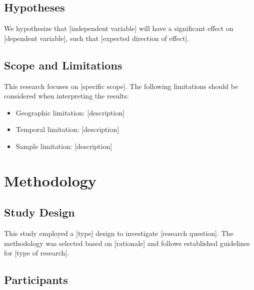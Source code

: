 \documentclass[11pt,letterpaper]{report}
\begin{document}
\section{Hypotheses}

\begin{hypothesis}
We hypothesize that [independent variable] will have a significant effect on [dependent variable], such that [expected direction of effect].
\end{hypothesis}

\section{Scope and Limitations}

\begin{limitations}
This research focuses on [specific scope]. The following limitations should be considered when interpreting the results:
\begin{itemize}
    \item Geographic limitation: [description]
    \item Temporal limitation: [description]
    \item Sample limitation: [description]
\end{itemize}
\end{limitations}


\chapter{Methodology}

\section{Study Design}

\begin{methodology}
This study employed a [type] design to investigate [research question]. The methodology was selected based on [rationale] and follows established guidelines for [type of research].
\end{methodology}

\section{Participants}
\end{document}
